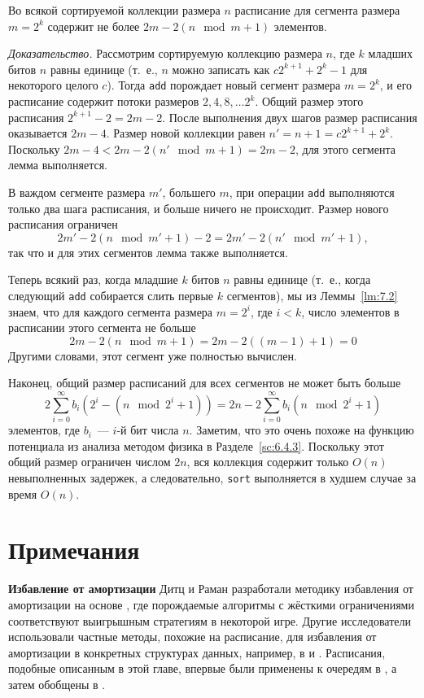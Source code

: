 \begin{lemma}\label{lm:7.2}
  Во всякой сортируемой коллекции размера $n$ расписание для сегмента
  размера $m = 2^k$ содержит не более $2m - 2(n \mod m + 1)$ элементов.

  \emph{Доказательство.} Рассмотрим сортируемую коллекцию размера $n$,
где $k$ младших битов $n$ равны единице (т.~е., $n$ можно записать как
$c2^{k+1} + 2^k -1$ для некоторого целого $c$). Тогда \lstinline!add!
порождает новый сегмент размера $m = 2^k$, и его расписание содержит
потоки размеров $2, 4, 8, \ldots 2^k$. Общий размер этого расписания
$2^{k+1} - 2 = 2m - 2$. После выполнения двух шагов размер расписания
оказывается $2m - 4$. Размер новой коллекции равен $n' = n + 1 =
c2^{k+1} + 2^k$. Поскольку $2m - 4  < 2m - 2(n' \mod m + 1) = 2m - 2$,
для этого сегмента лемма выполняется.

В важдом сегменте размера $m'$, большего $m$, при операции
\lstinline!add! выполняются только два шага
расписания, и больше ничего не происходит. Размер нового расписания
ограничен
$$
2m' - 2(n \mod m' + 1) - 2 = 2m' - 2(n' \mod m' + 1),
$$
так что и для этих сегментов лемма также выполняется.
\end{lemma}

Теперь всякий раз, когда младшие $k$ битов $n$ равны единице (т.~е.,
когда следующий \lstinline!add! собирается слить первые $k$
сегментов), мы из Леммы~\ref{lm:7.2} знаем, что для каждого сегмента
размера $m = 2^i$, где $i < k$, число элементов в расписании этого
сегмента не больше
$$
2m -2(n \mod m + 1) = 2m - 2((m-1) + 1) = 0
$$
Другими словами, этот сегмент уже полностью вычислен.

Наконец, общий размер расписаний для всех сегментов не может быть
больше
$$
2 \sum_{i=0}^\infty b_i(2^i - (n \mod 2^i + 1)) = 2n - 2 \sum_{i=0}^\infty b_i (n \mod 2^i + 1)
$$
элементов, где $b_i$~--- $i$-й бит числа $n$. Заметим, что это очень
похоже на функцию потенциала из анализа методом физика в
Разделе~\ref{sc:6.4.3}. Поскольку этот общий размер ограничен числом
$2n$, вся коллекция содержит только $O(n)$ невыполненных задержек, а
следовательно, \lstinline!sort! выполняется в худшем случае за время
$O(n)$.

\section{Примечания}
\label{sc:7.5}

\noindent
\textbf{Избавление от амортизации}
Дитц и Раман \cite{DietzRaman1991, DietzRaman1993, Raman1992}
разработали методику избавления от амортизации на основе
, где порождаемые алгоритмы с
жёсткими ограничениями соответствуют выигрышным стратегиям в некоторой
игре. Другие исследователи использовали частные методы, похожие на
расписание, для избавления от амортизации в конкретных структурах
данных, например, в  \cite{CarlssonMunroPoblete1988} и
\cite{Driscoll-etal1988}. Расписания, подобные описанным в этой главе,
впервые были применены к очередям в \cite{Okasaki1995c}, а затем
обобщены в \cite{Okasaki1996b}.

